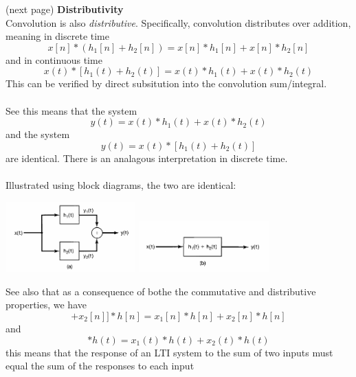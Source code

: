\documentclass{report}
\begin{document}
(next page)\newpage
\noindent\textbf{Distributivity}\\
Convolution is also \textit{distributive}. Specifically, convolution distributes over addition, meaning in discrete time
\begin{equation*}
x[n]*(h_1[n]+h_2[n])=x[n]*h_1[n]+x[n]*h_2[n]
\end{equation*}
and in continuous time
\begin{equation*}
x(t)*[h_1(t)+h_2(t)]=x(t)*h_1(t)+x(t)*h_2(t)
\end{equation*}
This can be verified by direct subsitution into the convolution sum/integral.\\
\vspace{1mm}\\
See this means that the system
\begin{equation*}
y(t)=x(t)*h_1(t)+x(t)*h_2(t)
\end{equation*}
and the system
\begin{equation*}
y(t)=x(t)*[h_1(t)+h_2(t)]
\end{equation*}
are identical. There is an analagous interpretation in discrete time.\\
\vspace{1mm}\\
Illustrated using block diagrams, the two are identical:
\begin{center}
\includegraphics[width=5cm]{a43}
\includegraphics[width=5cm]{a44}
\end{center}
See also that as a consequence of bothe the commutative and distributive properties, we have
\begin{equation*}
[x_1[n]+x_2[n]]*h[n]=x_1[n]*h[n]+x_2[n]*h[n]
\end{equation*}
and
\begin{equation*}
[x_1(t)+x_2(t)]*h(t)=x_1(t)*h(t)+x_2(t)*h(t)
\end{equation*}
this means that the response of an LTI system to the sum of two inputs must equal the sum of the responses to each input 
\end{document}
